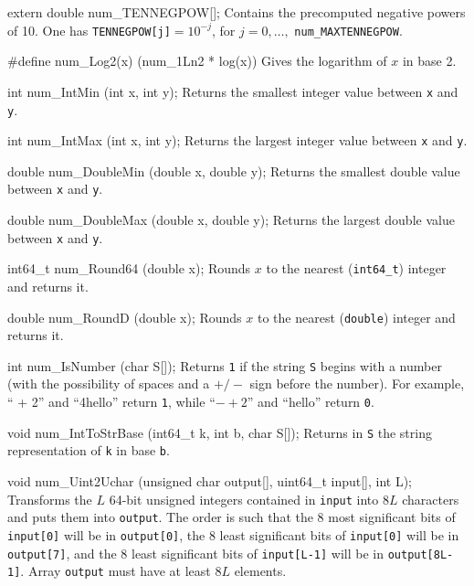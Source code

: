 extern double num_TENNEGPOW[];
\endcode
 \tab Contains the precomputed negative powers of 10.
   One has {\tt TENNEGPOW[j]}$ = 10^{-j}$, for $j=0,\ldots,$
 {\tt num\_MAXTENNEGPOW}.
\endtab


\code

#define num_Log2(x) (num_1Ln2 * log(x))
\endcode
  \tab Gives the logarithm of $x$ in base 2.
  \endtab
\code

int num_IntMin (int x, int y);
\endcode
  \tab Returns the smallest integer value between {\tt x} and {\tt y}.
  \endtab
\code

int num_IntMax (int x, int y);
\endcode
  \tab Returns the largest integer value between {\tt x} and {\tt y}.
  \endtab
\code

double num_DoubleMin (double x, double y);
\endcode
  \tab Returns the smallest double value between {\tt x} and {\tt y}.
  \endtab
\code

double num_DoubleMax (double x, double y);
\endcode
  \tab Returns the largest double value between {\tt x} and {\tt y}.
  \endtab
\code

int64_t num_Round64 (double x);
\endcode
  \tab Rounds $x$ to the nearest ({\tt int64\_t}) integer and returns it.
  \endtab
\code

double num_RoundD (double x);
\endcode
  \tab Rounds $x$ to the nearest ({\tt double}) integer and returns it.
  \endtab
\code

int num_IsNumber (char S[]);
\endcode
\tab  Returns {\tt 1} if the string {\tt S} begins with a number
   (with the possibility of spaces and a $+/-$ sign
   before the number). For example, `` + 2'' and ``4hello''
   return {\tt 1}, while ``$-+2$'' and ``hello'' return  {\tt 0}.
\endtab
\code

void num_IntToStrBase (int64_t k, int b, char S[]);
\endcode
  \tab Returns in {\tt S} the string representation of {\tt k} in base {\tt b}.
  \endtab
\code

void num_Uint2Uchar (unsigned char output[], uint64_t input[], int L);
\endcode
  \tab Transforms the $L$ 64-bit unsigned integers contained in {\tt input} into
  $8L$ characters and puts them into {\tt output}. The order is such that
  the 8 most significant bits of {\tt input[0]} will be in {\tt output[0]},
  the 8 least significant bits of {\tt input[0]} will be in {\tt output[7]},
  and the 8 least significant bits of {\tt input[L-1]} will be in
  {\tt output[8L-1]}. Array {\tt output} must have at least $8L$ elements.
  \endtab
\code

